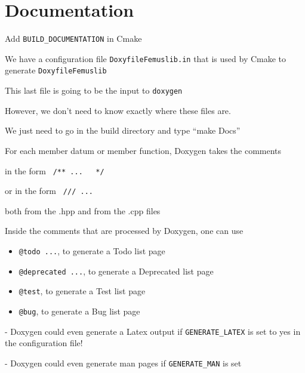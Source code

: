 \documentclass[10pt]{book}
\begin{document}
  \chapter{Documentation}
  
  Add \verb|BUILD_DOCUMENTATION| in Cmake
  
  We have a configuration file \verb|DoxyfileFemuslib.in|
  that is used by Cmake to generate \verb|DoxyfileFemuslib|
  
  This last file is going to be the input to \verb|doxygen|
  
  However, we don't need to know exactly where these files are.
  
  We just need to go in the build directory and type ``make Docs''
  
  For each member datum or member function, 
   Doxygen takes the comments 
   
    in the form \verb| /** ...   */ |
    
    or in the form \verb| /// ... |
    
    both from the .hpp and from the .cpp files
  
    Inside the comments that are processed by Doxygen, one can use 
    \begin{itemize}
     \item 
        \verb|@todo ...|, to generate a Todo list page
     \item 
        \verb|@deprecated ...|, to generate a Deprecated list page
     \item 
        \verb|@test|, to generate a Test list page
     \item 
        \verb|@bug|, to generate a Bug list page
    \end{itemize}
  

    
    - Doxygen could even generate a Latex output if \verb|GENERATE_LATEX| is set to yes in the configuration file!

  - Doxygen could even generate man pages if \verb|GENERATE_MAN| is set
  
  
  
\end{document}
